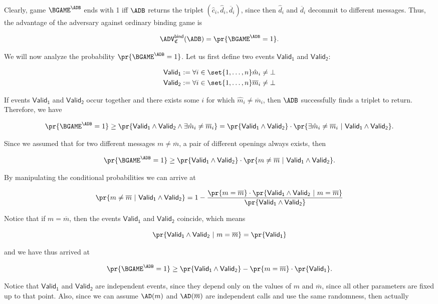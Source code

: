 \documentclass{crypto-exercise}
\newcommand{\CS}{\mathfrak{C}}
\newcommand{\Vone}{\mathsf{Valid_1}}
\newcommand{\Vtwo}{\mathsf{Valid_2}}
\begin{document}
\begin{solution}
Clearly, game $\BGAME^{\ADB}$ ends with 1 iff $\ADB$ returns the triplet $(\hat{c}_i,\hat{d}_i,\overline{d}_i)$, since then $\hat{d}_i$ and $\overline{d}_i$ decommit to different messages. Thus, the advantage of the adversary against ordinary binding game is

\[\advBindXX{\CS}{\ADB}=\pr{\BGAME^\ADB=1} .\]

We will now analyze the probability $\pr{\BGAME^\ADB=1}$. Let us first define two events $\Vone$ and $\Vtwo$:

\begin{align*}
\Vone := \forall i \in \set{1,\ldots,n} \hat{m}_i \neq \bot\\
\Vtwo := \forall i \in \set{1,\ldots,n} \overline{m}_i \neq \bot\\
\end{align*}

If events $\Vone$ and $\Vtwo$ occur together and there exists some $i$ for which $\hat{m}_i \neq \overline{m}_i$, then $\ADB$ successfully finds a triplet to return. Therefore, we have

\[\pr{\BGAME^{\ADB} = 1} \geq \pr{\Vone \wedge \Vtwo \wedge \exists \hat{m}_i\neq \overline{m}_i} =  \pr{\Vone \wedge \Vtwo}\cdot \pr{\exists \hat{m}_i\neq \overline{m}_i \ | \ \Vone \wedge \Vtwo} .\]

Since we assumed that for two different messages $m \neq \overline{m}$, a pair of different openings always exists, then

\[\pr{\BGAME^{\ADB} = 1} \geq \pr{\Vone \wedge \Vtwo}\cdot \pr{m \neq \overline{m} \ | \ \Vone \wedge \Vtwo} .\]

By manipulating the conditional probabilities we can arrive at 

\[\pr{m \neq \overline{m} \ | \ \Vone \wedge \Vtwo} = 1 - \frac{\pr{m = \overline{m}}\cdot\pr{\Vone \wedge\Vtwo\ |\ m = \overline{m}}}{\pr{\Vone\wedge\Vtwo}}\]

Notice that if $m = \overline{m}$, then the events $\Vone$ and $\Vtwo$ coincide, which means

\[\pr{\Vone \wedge\Vtwo\ |\ m = \overline{m}} = \pr{\Vone}\]

and we have thus arrived at

\[\pr{\BGAME^{\ADB} = 1} \geq \pr{\Vone \wedge \Vtwo} - \pr{m = \overline{m}}\cdot\pr{\Vone} .\]


Notice that $\Vone$ and $\Vtwo$ are independent events, since they depend only on the values of $m$ and $\overline{m}$, since all other parameters are fixed up to that point. Also, since we can assume $\AD(m)$ and $\AD(\overline{m})$ are independent calls and use the same randomness, then actually 


\end{solution}
\end{document}
